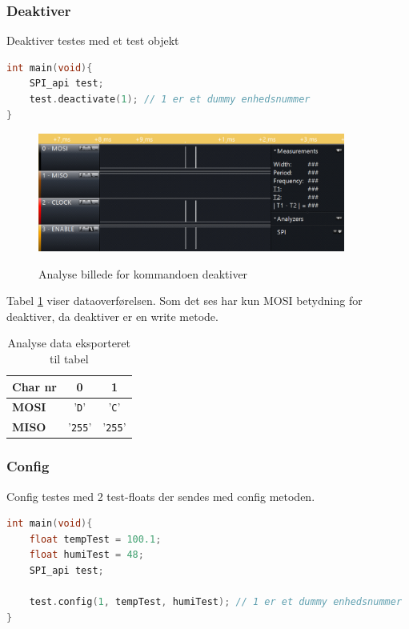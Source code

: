 \subsubsection*{Deaktiver}
Deaktiver testes med et test objekt

\begin{lstlisting}[language=C]
int main(void){
	SPI_api test;
	test.deactivate(1); // 1 er et dummy enhedsnummer
}
\end{lstlisting}

\begin{figure}[H]
\centering
{\includegraphics[width=0.90\textwidth]{filer/integrationstest/billeder/spi_deactivate}}
\caption{Analyse billede for kommandoen deaktiver}
\label{lab:scop_deactivate}
\end{figure}

Tabel \ref{table:scop_deactivate} viser dataoverførelsen. Som det ses har kun MOSI betydning for deaktiver, da deaktiver er en write metode. 

\begin{table}[h]
	\caption{Analyse data eksporteret til tabel}
	\centering
	\begin{tabular}{|l|c|c|}
		\hline 
		\textbf{Char nr} & \textbf{0} & \textbf{1} \\ 		
		\hline 
		\textbf{MOSI} & '\verb+D+' & '\verb+C+' \\ 
		\hline 
		\textbf{MISO} & '\verb+255+' & '\verb+255+' \\ 
		\hline 
	\end{tabular} 
	\label{table:scop_deactivate}
\end{table}


\subsubsection*{Config}
Config testes med 2 test-floats der sendes med config metoden.

\begin{lstlisting}[language=C]
int main(void){
	float tempTest = 100.1;
	float humiTest = 48;
	SPI_api test;
	
	test.config(1, tempTest, humiTest); // 1 er et dummy enhedsnummer
}
\end{lstlisting}



